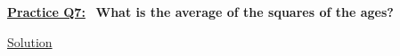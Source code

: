 



\bigskip \bigskip

\underline{\textbf{Practice Q7:}} \ \textbf{What is the average of the squares of the ages?}

\bigskip

\underline{Solution}